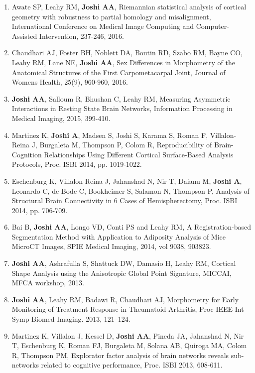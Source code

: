 \documentclass[overlapped,line,letterpaper]{res}
\begin{document}
\begin{resume}
\begin{enumerate}
    \item Awate SP, Leahy RM, \textbf{Joshi AA}, {Riemannian statistical analysis of cortical geometry with robustness to partial homology and misalignment}, International Conference on Medical Image Computing and Computer-Assisted Intervention, 237-246, 2016.

    \item Chaudhari AJ, Foster BH, Noblett DA, Boutin RD, Szabo RM, Bayne CO, Leahy RM, Lane NE, \textbf{Joshi AA}, {Sex Differences in Morphometry of the Anatomical Structures of the First Carpometacarpal Joint}, Journal of Womens Health, 25(9), 960-960, 2016.

    \item \textbf{Joshi AA}, Salloum R, Bhushan C, Leahy RM, {Measuring Asymmetric Interactions in Resting State Brain Networks, Information Processing in Medical Imaging}, 2015, 399-410.


    \item Martinez K, \textbf{Joshi A}, Madsen S, Joshi S, Karama S, Roman F, Villalon-Reina J, Burgaleta M, Thompson P, Colom R, {Reproducibility of Brain-Cognition Relationships Using Different Cortical Surface-Based Analysis Protocols}, Proc. ISBI 2014, pp. 1019-1022.

    \item Eschenburg K, Villalon-Reina J, Jahanshad N, Nir T, Daianu M, \textbf{Joshi A}, Leonardo C, de Bode C, Bookheimer S, Salamon N, Thompson P, {Analysis of Structural Brain Connectivity in 6 Cases of Hemispherectomy},  Proc. ISBI 2014, pp. 706-709.


    \item Bai B, \textbf{Joshi AA}, Longo VD, Conti PS and Leahy RM, {A Registration-based Segmentation Method with Application to Adiposity Analysis of Mice MicroCT Images}, SPIE Medical Imaging, 2014, vol 9038, 903823.

    \item \textbf{Joshi AA}, Ashrafulla S, Shattuck DW, Damasio H, Leahy RM, {Cortical Shape Analysis using the Anisotropic Global Point Signature}, MICCAI, MFCA workshop, 2013.
 
    \item \textbf{Joshi AA}, Leahy RM, Badawi R, Chaudhari AJ, {Morphometry for Early Monitoring of Treatment Response in Theumatoid Arthritis}, Proc IEEE Int Symp Biomed Imaging. 2013, 121–124. 

    \item Martinez K, Villalon J, Kessel D, \textbf{Joshi AA}, Pineda JA, Jahanshad N, Nir T, Eschenburg K, Roman FJ, Burgaleta M, Solana AB, Quiroga MA, Colom R, Thompson PM, {Explorator factor analysis of brain networks reveals sub-networks related to cognitive performance}, Proc. ISBI 2013, 608-611.


\end{enumerate}
\end{resume}
\end{document}
